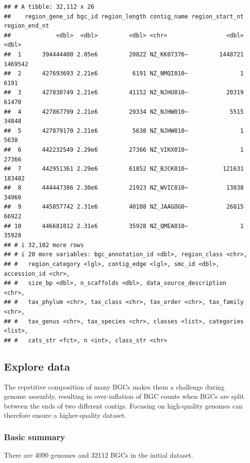 \documentclass[
]{article}
\begin{document}
\begin{verbatim}
## # A tibble: 32,112 x 26
##    region_gene_id bgc_id region_length contig_name region_start_nt region_end_nt
##             <dbl>  <dbl>         <dbl> <chr>                 <dbl>         <dbl>
##  1      394444400 2.05e6         20822 NZ_KK07376~         1448721       1469542
##  2      427693693 2.21e6          6191 NZ_NMQI010~               1          6191
##  3      427830749 2.21e6         41152 NZ_NJHU010~           20319         61470
##  4      427867799 2.21e6         29334 NZ_NJHW010~            5515         34848
##  5      427879170 2.21e6          5638 NZ_NJHW010~               1          5638
##  6      442232549 2.29e6         27366 NZ_VIKX010~               1         27366
##  7      442951361 2.29e6         61852 NZ_BJCK010~          121631        183482
##  8      444447386 2.30e6         21923 NZ_WVIC010~           13038         34960
##  9      445057742 2.31e6         40108 NZ_JAAGOG0~           26815         66922
## 10      446681012 2.31e6         35928 NZ_QMEA010~               1         35928
## # i 32,102 more rows
## # i 20 more variables: bgc_annotation_id <dbl>, region_class <chr>,
## #   region_category <lgl>, contig_edge <lgl>, smc_id <dbl>, accession_id <chr>,
## #   size_bp <dbl>, n_scaffolds <dbl>, data_source_description <chr>,
## #   tax_phylum <chr>, tax_class <chr>, tax_order <chr>, tax_family <chr>,
## #   tax_genus <chr>, tax_species <chr>, classes <list>, categories <list>,
## #   cats_str <fct>, n <int>, class_str <chr>
\end{verbatim}

\hypertarget{explore-data}{%
\subsection{Explore data}\label{explore-data}}

The repetitive composition of many BGCs makes them a challenge during
genome assembly, resulting in over-inflation of BGC counts when BGCs are
split between the ends of two different contigs. Focusing on
high-quality genomes can therefore ensure a higher-quality dataset.

\hypertarget{basic-summary}{%
\subsubsection{Basic summary}\label{basic-summary}}

There are 4090 genomes and 32112 BGCs in the initial dataset.
\end{document}
